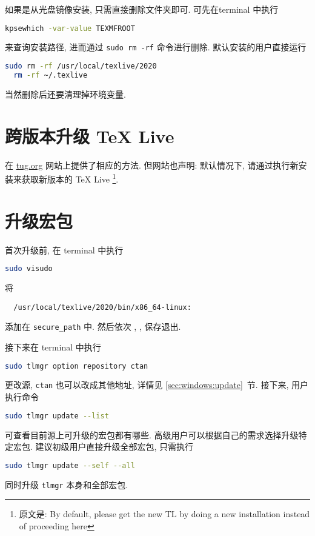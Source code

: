如果是从光盘镜像安装, 只需直接删除文件夹即可.
可先在\textsf{terminal} 中执行
\begin{lstlisting}[language = bash]
  kpsewhich -var-value TEXMFROOT
\end{lstlisting}
来查询安装路径,
进而通过 \texttt{sudo rm -rf} 命令进行删除.
默认安装的用户直接运行
\begin{lstlisting}[language = bash]
  sudo rm -rf /usr/local/texlive/2020
  rm -rf ~/.texlive
\end{lstlisting}
当然删除后还要清理掉环境变量.

\section{跨版本升级 \TeX{} Live}\label{sec:ubuntu:version}

在 \href{https://www.tug.org/texlive/upgrade.html}{tug.org}
网站上提供了相应的方法.
但网站也声明:
默认情况下,
请通过执行新安装来获取新版本的 \TeX{} Live%
\footnote{原文是: By default,
please get the new TL by doing a new installation instead of proceeding here}.

\section{升级宏包}\label{sec:ubuntu:update}

首次升级前,
在 \textsf{terminal} 中执行
\begin{lstlisting}[language = bash]
  sudo visudo
\end{lstlisting}
将
\begin{lstlisting}
  /usr/local/texlive/2020/bin/x86_64-linux:
\end{lstlisting}
添加在 \texttt{secure\_path} 中.
然后依次 , , \keys{\enter} 保存退出.

接下来在 \textsf{terminal} 中执行
\begin{lstlisting}[language = bash]
  sudo tlmgr option repository ctan
\end{lstlisting}
更改源, \texttt{ctan} 也可以改成其他地址, 详情见 \ref{sec:windows:update}~节.
接下来, 用户执行命令
\begin{lstlisting}[language = bash]
  sudo tlmgr update --list
\end{lstlisting}
可查看目前源上可升级的宏包都有哪些. 
高级用户可以根据自己的需求选择升级特定宏包.
建议初级用户直接升级全部宏包,
只需执行
\begin{lstlisting}[language = bash]
  sudo tlmgr update --self --all
\end{lstlisting}
同时升级 \texttt{tlmgr} 本身和全部宏包. 

